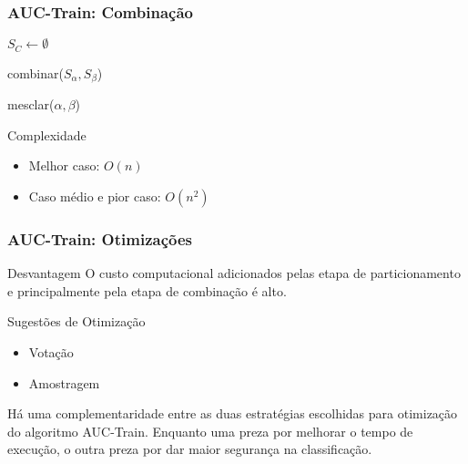 \begin{frame}
    \frametitle{AUC-Train: Combinação}

    \begin{function}[H]
        $S_C \gets \emptyset$\;



        \caption{combinar($S_{\alpha}, S_{\beta}$)}
    \end{function}

    \begin{function}[H]

        \caption{mesclar($\alpha, \beta$)}
    \end{function}

    \begin{block}{Complexidade}
        \begin{itemize}
            \item Melhor caso: $O(n)$
            \item Caso médio e pior caso: $O(n^2)$
        \end{itemize}
    \end{block}
\end{frame}

\begin{frame}
    \frametitle{AUC-Train: Otimizações}

    \begin{block}{Desvantagem}
        O custo computacional adicionados pelas etapa de particionamento e principalmente pela etapa de combinação é alto.
    \end{block}

    \begin{block}{Sugestões de Otimização}
        \begin{itemize}
            \item Votação
            \item Amostragem
        \end{itemize}
    \end{block}

    Há uma complementaridade entre as duas estratégias escolhidas para otimização do algoritmo AUC-Train. Enquanto uma preza por melhorar o tempo de execução, o outra preza por dar maior segurança na classificação.
\end{frame}

